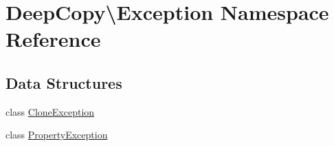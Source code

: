 \hypertarget{namespace_deep_copy_1_1_exception}{}\section{Deep\+Copy\textbackslash{}Exception Namespace Reference}
\label{namespace_deep_copy_1_1_exception}
\subsection*{Data Structures}
\begin{DoxyCompactItemize}
\item 
class \mbox{\hyperlink{class_deep_copy_1_1_exception_1_1_clone_exception}{Clone\+Exception}}
\item 
class \mbox{\hyperlink{class_deep_copy_1_1_exception_1_1_property_exception}{Property\+Exception}}
\end{DoxyCompactItemize}
